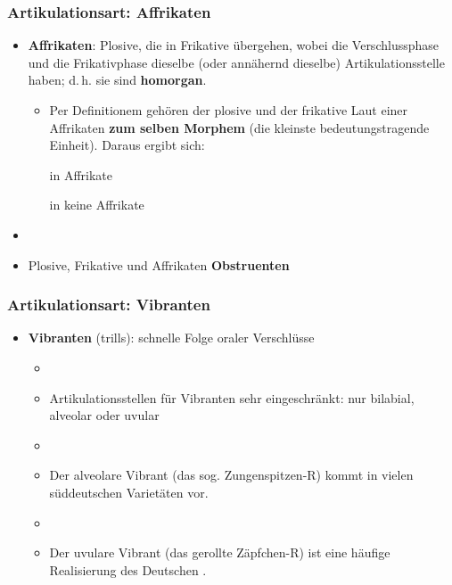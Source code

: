 
\begin{frame}
\frametitle{Artikulationsart: Affrikaten}

		\begin{itemize}
			\item \textbf{Affrikaten}: Plosive, die in Frikative übergehen, wobei die Verschlussphase und die Frikativphase dieselbe (oder annähernd dieselbe) Artikulationsstelle haben; d.\,h. sie sind \textbf{homorgan}.

			\ea \textipa{[ \t{pf} , \t{ts} , \t{tS} , \t{dZ} ]}
			\z

			\begin{itemize}
				\item Per Definitionem gehören der plosive und der frikative Laut einer Affrikaten \textbf{zum selben Morphem} (die kleinste bedeutungstragende Einheit). Daraus ergibt sich:

				\ea \textipa{[ \t{ts} ]} in  \ras Affrikate
				\z
				
				\ea \textipa{[ ts ]} in  \ras keine Affrikate
				\z

			\end{itemize}
		
		\item[]
		\item Plosive, Frikative und Affrikaten \ras \textbf{Obstruenten}
	\end{itemize}
	
\end{frame}



\begin{frame}
\frametitle{Artikulationsart: Vibranten}

		\begin{itemize}
			\item \textbf{Vibranten} (trills): schnelle Folge oraler Verschlüsse
			\begin{itemize}
				\item[]
				\item Artikulationsstellen für Vibranten sehr eingeschränkt: nur bilabial, alveolar oder uvular
				\item[]
				\item Der alveolare Vibrant \textipa{[ r ]} (das sog. Zungenspitzen-R) kommt in vielen süddeutschen Varietäten vor.
				\item[]
				\item Der uvulare Vibrant \textipa{[ \textscr\ ]} (das gerollte Zäpfchen-R) ist eine häufige Realisierung des Deutschen .
			\end{itemize}
			 
	\end{itemize}
	
\end{frame}


